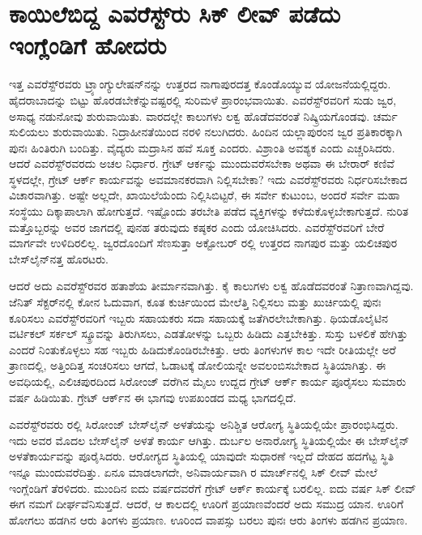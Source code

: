 
\chapter{ಕಾಯಿಲೆಬಿದ್ದ ಎವರೆಸ್ಟ್​ರು ಸಿಕ್​ ಲೀವ್​ ಪಡೆದು ಇಂಗ್ಲೆಂಡಿಗೆ ಹೋದರು}

ಇತ್ತ ಎವರೆಸ್ಟ್​ರವರು ಟ್ರ್ಯಾಂಗ್ಯುಲೇಷನ್​ನನ್ನು ಉತ್ತರದ ನಾಗಾಪುರದತ್ತ ಕೊಂಡೊಯ್ಯುವ ಯೋಜನೆಯಲ್ಲಿದ್ದರು. ಹೈದರಾಬಾದನ್ನು ಬಿಟ್ಟು ಹೊರಡಬೇಕೆನ್ನುವಷ್ಟರಲ್ಲಿ ಸುರಿಮಳೆ ಪ್ರಾರಂಭವಾಯಿತು. ಎವರೆಸ್ಟ್​ರವರಿಗೆ ಸುಡು ಜ್ವರ, ಅಸಾಧ್ಯ ನಡುನೋವು ಶುರುವಾಯಿತು. ವಾರದಲ್ಲೇ ಕಾಲುಗಳು ಲಕ್ವ ಹೊಡೆದವರಂತೆ ನಿಷ್ಕ್ರಿಯಗೊಂಡವು. ಚರ್ಮ ಸುಲಿಯಲು ಶುರುವಾಯಿತು. ನಿದ್ರಾಹೀನತೆಯಿಂದ ನರಳಿ ನಲುಗಿದರು. ಹಿಂದಿನ ಯಲ್ಲಾಪುರಂನ ಜ್ವರ ಪ್ರತಿಕಾರಕ್ಕಾಗಿ ಪುನಃ ಹಿಂತಿರುಗಿ ಬಂದಿತ್ತು. ವೈದ್ಯರು ಮದ್ರಾಸಿನ ಹವೆ ಸೂಕ್ತ ಎಂದರು. ವಿಶ್ರಾಂತಿ ಅವಶ್ಯಕ ಎಂದು ಎಚ್ಚರಿಸಿದರು. ಆದರೆ ಎವರೆಸ್ಟ್​ರವರದು ಅಚಲ ನಿರ್ಧಾರ. ಗ್ರೇಟ್​ ಆರ್ಕನ್ನು ಮುಂದುವರೆಸಬೇಕಾ ಅಥವಾ ಈ ಬೇರಾರ್​ ಕಣಿವೆ ಸ್ಥಳದಲ್ಲೇ, ಗ್ರೇಟ್​ ಆರ್ಕ್ ಕಾರ್ಯವನ್ನು ಅವಮಾನಕರವಾಗಿ ನಿಲ್ಲಿಸಬೇಕಾ? ಇದು ಎವರೆಸ್ಟ್​ರವರು ನಿರ್ಧರಿಸಬೇಕಾದ ವಿಚಾರವಾಗಿತ್ತು. ಅಷ್ಟೇ ಅಲ್ಲದೇ, ಖಾಯಿಲೆಯೆಂದು ನಿಲ್ಲಿಸಿಬಿಟ್ಟರೆ, ಈ ಸರ್ವೇ ಕುಟುಂಬ, ಅಂದರೆ ಸರ್ವೇ ಮಹಾ ಸಂಸ್ಥೆಯು ದಿಕ್ಕಾಪಾಲಾಗಿ ಹೋಗುತ್ತದೆ. ಇಷ್ಟೊಂದು ತರಬೇತಿ ಪಡೆದ ವ್ಯಕ್ತಿಗಳನ್ನು ಕಳೆದುಕೊಳ್ಳಬೇಕಾಗುತ್ತದೆ. ನುರಿತ ಮತ್ತೊಬ್ಬರನ್ನು ಅವರ ಜಾಗದಲ್ಲಿ ಪುನಹ ತರುವುದು ಕಷ್ಠಕರ ಎಂದು ಯೋಚಿಸಿದರು. ಎವರೆಸ್ಟ್​ರವರಿಗೆ ಬೇರೆ ಮಾರ್ಗವೇ ಉಳಿದಿರಲಿಲ್ಲ. ಜ್ವರದೊಂದಿಗೆ ಸೆಣಸುತ್ತಾ ಅಕ್ಟೋಬರ್​ ರಲ್ಲಿ ಉತ್ತರದ ನಾಗಪುರ ಮತ್ತು ಯಲಿಚಪುರ ಬೇಸ್‌ಲೈನ್​ನತ್ತ ಹೊರಟರು.

\newpage

ಆದರೆ ಅದು ಎವರೆಸ್ಟ್​ರವರ ಹತಾಶೆಯ ತೀರ್ಮಾನವಾಗಿತ್ತು. ಕೈ ಕಾಲುಗಳು ಲಕ್ವ ಹೊಡೆದವರಂತೆ ನಿತ್ರಾಣವಾಗಿದ್ದವು. ಜೆನಿತ್​ ಸೆಕ್ಟರ್​ನಲ್ಲಿ ಕೋನ ಓದುವಾಗ, ಕೂತ ಕುರ್ಚಿಯಿಂದ ಮೇಲೆತ್ತಿ ನಿಲ್ಲಿಸಲು ಮತ್ತು ಖುರ್ಚಿಯಲ್ಲಿ ಪುನಃ ಕೂರಿಸಲು ಎವರೆಸ್ಟ್​ರವರಿಗೆ ಇಬ್ಬರು ಸಹಾಯಕರು ಸದಾ ಸಹಾಯಕ್ಕೆ ಜತೆಗಿರಲೇಬೇಕಾಗಿತ್ತು. ಥಿಯಡೊಲೈಟಿನ ವರ್ಟಿಕಲ್​ ಸರ್ಕಲ್​ ಸ್ಕ್ರೂವನ್ನು ತಿರುಗಿಸಲು, ಎಡತೋಳನ್ನು ಒಬ್ಬರು ಹಿಡಿದು ಎತ್ತಬೇಕಿತ್ತು. ಸುಸ್ತು ಬಳಲಿಕೆ ಹೇಗಿತ್ತು ಎಂದರೆ ನಿಂತುಕೊಳ್ಳಲು ಸಹ ಇಬ್ಬರು ಹಿಡಿದುಕೊಂಡಿರಬೇಕಿತ್ತು. ಆರು ತಿಂಗಳುಗಳ ಕಾಲ ಇದೇ ರೀತಿಯಲ್ಲೇ ಅರೆ ತ್ರಾಣದಲ್ಲಿ, ಅತ್ತಿಂದಿತ್ತ ಸಂಚರಿಸಲು ಆಗದೆ, ಓಡಾಟಕ್ಕೆ ಡೋಲಿಯನ್ನೇ ಅವಲಂಬಿಸಬೇಕಾದ ಸ್ಥಿತಿಯಾಗಿತ್ತು. ಈ ಅವಧಿಯಲ್ಲಿ, ಎಲಿಚಪುರದಿಂದ ಸಿರೋಂಜ್​ ವರೆಗಿನ  ಮೈಲು ಉದ್ದದ ಗ್ರೇಟ್​ ಆರ್ಕ್ ಕಾರ್ಯ ಪೂರೈಸಲು ಸುಮಾರು  ವರ್ಷ ಹಿಡಿಯಿತು. ಗ್ರೇಟ್​ ಆರ್ಕ್‌ನ ಈ ಭಾಗವು ಉಪಖಂಡದ ಮಧ್ಯ ಭಾಗದಲ್ಲಿದೆ.

ಎವರೆಸ್ಟ್​ರವರು ರಲ್ಲಿ ಸಿರೋಂಜ್​ ಬೇಸ್​ಲೈನ್​ ಅಳತೆಯನ್ನು ಅನಿಶ್ಚಿತ ಆರೋಗ್ಯ ಸ್ಥಿತಿಯಲ್ಲಿಯೇ ಪ್ರಾರಂಭಿಸಿದ್ದರು. ಇದು ಅವರ ಮೊದಲ ಬೇಸ್‌ಲೈನ್​ ಅಳತೆ ಕಾರ್ಯ ಆಗಿತ್ತು. ದುರ್ಬಲ ಅನಾರೋಗ್ಯ ಸ್ಥಿತಿಯಲ್ಲಿಯೇ ಈ ಬೇಸ್‌ಲೈನ್​ ಅಳತೆಕಾರ್ಯವನ್ನು ಪೂರೈಸಿದರು. ಆರೋಗ್ಯದ ಸ್ಥಿತಿಯಲ್ಲಿ ಯಾವುದೇ ಸುಧಾರಣೆ ಇಲ್ಲದೆ ದೇಹದ ಹದಗೆಟ್ಟ ಸ್ಥಿತಿ ಇನ್ನೂ ಮುಂದುವರೆದಿತ್ತು. ಏನೂ ಮಾಡಲಾಗದೇ, ಅನಿವಾರ್ಯವಾಗಿ ರ ಮಾರ್ಚ್‌ನಲ್ಲಿ ಸಿಕ್​ ಲೀವ್​ ಮೇಲೆ ಇಂಗ್ಲೆಂಡಿಗೆ ತೆರಳಿದರು. ಮುಂದಿನ ಐದು ವರ್ಷದವರೆಗೆ ಗ್ರೇಟ್​ ಆರ್ಕ್ ಕಾರ್ಯಕ್ಕೆ ಬರಲಿಲ್ಲ. ಐದು ವರ್ಷ ಸಿಕ್​ ಲೀವ್​ ಈಗ ನಮಗೆ ದೀರ್ಘವೆನಿಸುತ್ತದೆ. ಆದರೆ, ಆ ಕಾಲದಲ್ಲಿ ಊರಿಗೆ ಪ್ರಯಾಣವೆಂದರೆ ಅದು ಸಮುದ್ರ ಯಾನ. ಊರಿಗೆ ಹೋಗಲು ಹಡಗಿನ ಆರು ತಿಂಗಳು ಪ್ರಯಾಣ. ಊರಿಂದ ವಾಪಸ್ಸು ಬರಲು ಪುನಃ ಆರು ತಿಂಗಳು ಹಡಗಿನ ಪ್ರಯಾಣ.

